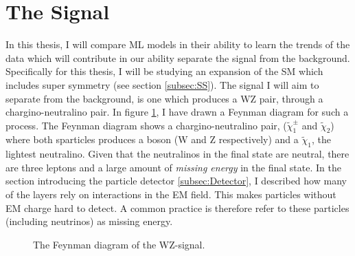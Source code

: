 \section{The Signal}\label{sec:signal}
In this thesis, I will compare \ac{ML} models in their ability to learn the trends of the data which will contribute  
in our ability separate the signal from the background. Specifically for this thesis, I will be studying an expansion of the 
\ac{SM} which includes super symmetry (see section \ref{subsec:SS}). The signal I will aim to separate from the background, is one 
which produces a WZ pair, through a chargino-neutralino pair. In figure \ref{fig:signal}, I have drawn a Feynman diagram for 
such a process. The Feynman diagram shows a chargino-neutralino pair, ($\tilde{\chi}_1^\pm$ and $\tilde{\chi}_2$)
where both sparticles produces a boson (W and Z respectively) and a $\tilde{\chi}_1$, the lightest neutralino. Given that the 
neutralinos in the final state are neutral, there are three leptons and a large amount of \emph{missing energy} in the final state.
In the section introducing the particle detector \ref{subsec:Detector}, I described how many of the layers rely on interactions in 
the \ac{EM} field. This makes particles without \ac{EM} charge hard to detect. A common practice is therefore refer to these particles 
(including neutrinos) as missing energy.
\begin{figure}
    \centering
    \caption{The Feynman diagram of the WZ-signal.}
    \label{fig:signal}
\end{figure}
